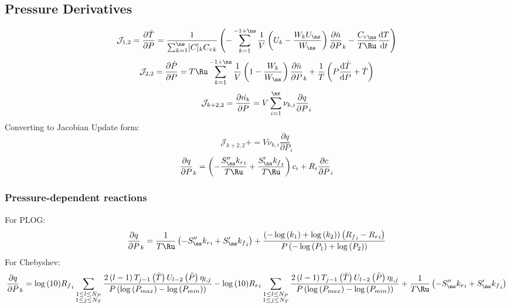\documentclass[a4paper,10pt]{article}
\newcommand{\pluseq}{\mathrel{{+}{=}}}
\begin{document}
\subsection{Pressure Derivatives}
\begin{dmath} \mathcal{J}_{1,2} = \frac{\partial\dot{T}}{\partial{P}} = \frac{1}{\sum_{k=1}^{\ns} [C]_{k} {C_v}_{k}} \left(- \sum_{k=1}^{-1 + \ns} \frac{1}{V} \left(U_{k} - \frac{W_{k} U_{\ns}}{W_{\ns}}\right) \frac{\partial \dot{n} }{\partial P }_{k} - \frac{{C_v}_{\ns}}{T \Ru} \frac{\text{d} T }{\text{d} t }\right)\end{dmath} 
\begin{dmath} \mathcal{J}_{2,2} = \frac{\partial \dot{ P } }{\partial P } = T \Ru \sum_{k=1}^{-1 + \ns} \frac{1}{V} \left(1 - \frac{W_{k}}{W_{\ns}}\right) \frac{\partial \dot{n} }{\partial P }_{k} + \frac{1}{T} \left(P \frac{\text{d} \dot{T} }{\text{d} P } + \dot{T}\right)\end{dmath} 
\begin{dmath} \mathcal{J}_{k + 2,2} = \frac{\partial \dot{n_k} }{\partial P } = V \sum_{i=1}^{\nr} \nu_{k,i} \frac{\partial q }{\partial P }_{i}\end{dmath} 
Converting to Jacobian Update form:
\begin{dmath} \mathcal{J}_{k + 2,2}\pluseq V \nu_{k,i} \frac{\partial q }{\partial P }_{i}\end{dmath} 
\begin{dmath} \frac{\partial q }{\partial P }_{k} = \left(- \frac{S^{\prime\prime}_{\ns} {k_r}_{i}}{T \Ru} + \frac{S^{\prime}_{\ns} {k_f}_{i}}{T \Ru}\right) c_{i} + R_{i} \frac{\partial c }{\partial P }_{i}\end{dmath} 
\subsubsection{Pressure-dependent reactions}
For PLOG:
\begin{dmath} \frac{\partial q }{\partial P }_{k} = \frac{1}{T \Ru} \left(- S^{\prime\prime}_{\ns} {k_r}_{i} + S^{\prime}_{\ns} {k_f}_{i}\right) + \frac{\left(- \log{\left (k_{1} \right )} + \log{\left (k_{2} \right )}\right) \left({R_f}_{i} - {R_r}_{i}\right)}{P \left(- \log{\left (P_{1} \right )} + \log{\left (P_{2} \right )}\right)}\end{dmath} 
For Chebyshev:
\begin{dmath} \frac{\partial q }{\partial P }_{k} = \log{\left (10 \right )} {R_f}_{i} \sum_{\substack{1 \leq l \leq N_{P}\\1 \leq j \leq N_{T}}} \frac{2 \left(l - 1\right) T_{j - 1}\left(\tilde{T}\right) U_{l - 2}\left(\tilde{P}\right) \eta_{l,j}}{P \left(\log{\left (P_{max} \right )} - \log{\left (P_{min} \right )}\right)} - \log{\left (10 \right )} {R_r}_{i} \sum_{\substack{1 \leq l \leq N_{P}\\1 \leq j \leq N_{T}}} \frac{2 \left(l - 1\right) T_{j - 1}\left(\tilde{T}\right) U_{l - 2}\left(\tilde{P}\right) \eta_{l,j}}{P \left(\log{\left (P_{max} \right )} - \log{\left (P_{min} \right )}\right)} + \frac{1}{T \Ru} \left(- S^{\prime\prime}_{\ns} {k_r}_{i} + S^{\prime}_{\ns} {k_f}_{i}\right)\end{dmath} 
\end{document}
